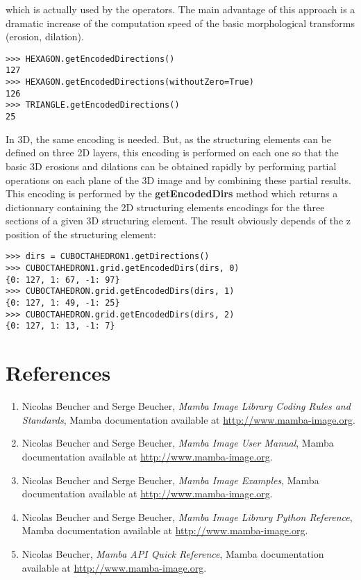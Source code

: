 \documentclass[a4paper,10pt,oneside]{article}
\begin{document}
which is actually used by the operators. The main advantage of this approach is a dramatic increase of the computation speed of the basic
morphological transforms (erosion, dilation).

\lstset{language=Python}
\begin{lstlisting}
>>> HEXAGON.getEncodedDirections()
127
>>> HEXAGON.getEncodedDirections(withoutZero=True)
126
>>> TRIANGLE.getEncodedDirections()
25
\end{lstlisting}

In 3D, the same encoding is needed. But, as the structuring elements can be defined on three 2D layers, this encoding is performed on each
one so that the basic 3D erosions and dilations can be obtained rapidly by performing partial operations on each plane of the 3D image and by
combining these partial results. This encoding is performed by the \textbf{getEncodedDirs} method which returns a dictionnary containing the 2D
structuring elements encodings for the three sections of a given 3D structuring element. The result obviously depends of the z position of the
structuring element:

\lstset{language=Python}
\begin{lstlisting}
>>> dirs = CUBOCTAHEDRON1.getDirections()
>>> CUBOCTAHEDRON1.grid.getEncodedDirs(dirs, 0)
{0: 127, 1: 67, -1: 97}
>>> CUBOCTAHEDRON.grid.getEncodedDirs(dirs, 1)
{0: 127, 1: 49, -1: 25}
>>> CUBOCTAHEDRON.grid.getEncodedDirs(dirs, 2)
{0: 127, 1: 13, -1: 7}
\end{lstlisting}

\section{References}
\begin{enumerate}
\setcounter{enumi}{0}
\item \label{art:MILCRSman} Nicolas Beucher and Serge Beucher,
\emph{Mamba Image Library Coding Rules and Standards},
Mamba documentation available at \url{http://www.mamba-image.org}.
\item \label{art:MIUman} Nicolas Beucher and Serge Beucher,
\emph{Mamba Image User Manual},
Mamba documentation available at \url{http://www.mamba-image.org}.
\item \label{art:MIEman} Nicolas Beucher and Serge Beucher,
\emph{Mamba Image Examples},
Mamba documentation available at \url{http://www.mamba-image.org}.
\item \label{art:MILPRman} Nicolas Beucher and Serge Beucher,
\emph{Mamba Image Library Python Reference},
Mamba documentation available at \url{http://www.mamba-image.org}.
\item \label{art:MQRman} Nicolas Beucher,
\emph{Mamba API Quick Reference},
Mamba documentation available at \url{http://www.mamba-image.org}.\end{enumerate}
\end{document}
